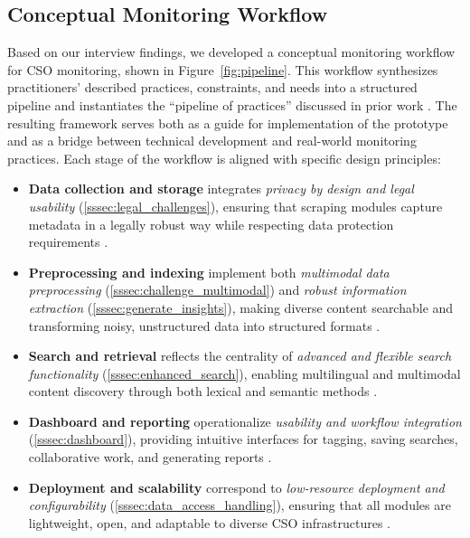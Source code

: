 \documentclass[acmsmall]{acmart}
\begin{document}
\subsection{Conceptual Monitoring Workflow}
Based on our interview findings, we developed a conceptual monitoring workflow for CSO monitoring, shown in Figure~\ref{fig:pipeline}. This workflow synthesizes practitioners' described practices, constraints, and needs into a structured pipeline and instantiates the ``pipeline of practices'' discussed in prior work \cite{micallef_true_2022}. The resulting framework serves both as a guide for implementation of the prototype and as a bridge between technical development and real-world monitoring practices. Each stage of the workflow is aligned with specific design principles: 
\begin{itemize}
    \item \textbf{Data collection and storage} integrates \textit{privacy by design and legal usability} (\ref{sssec:legal_challenges}), ensuring that scraping modules capture metadata in a legally robust way while respecting data protection requirements \cite{baumler_harnessing_2025,hancock_seeing_2024,lakomy_open-source_2024}. 
   \item \textbf{Preprocessing and indexing} implement both \textit{multimodal data preprocessing} (\ref{sssec:challenge_multimodal}) and \textit{robust information extraction} (\ref{sssec:generate_insights}), making diverse content searchable and transforming noisy, unstructured data into structured formats \cite{cifliku_save_2025, juneja_human_2022,liu_human-centered_2024,ayache2024whispernerunifiedopennamed}. 
   \item \textbf{Search and retrieval} reflects the centrality of \textit{advanced and flexible search functionality} (\ref{sssec:enhanced_search}), enabling multilingual and multimodal content discovery through both lexical and semantic methods \cite{mukhopadhyay_osint_2024,beers_examining_2020,juneja_human_2022}. 
   \item \textbf{Dashboard and reporting} operationalize \textit{usability and workflow integration} (\ref{sssec:dashboard}), providing intuitive interfaces for tagging, saving searches, collaborative work, and generating reports \cite{cifliku_save_2025,baumler_harnessing_2025,liu_human-centered_2024}. 
   \item \textbf{Deployment and scalability} correspond to \textit{low-resource deployment and configurability} (\ref{sssec:data_access_handling}), ensuring that all modules are lightweight, open, and adaptable to diverse CSO infrastructures \cite{baumler_harnessing_2025,hummel_civil_2022,hulshof-schmidt_2024_2024,hancock_seeing_2024}.
\end{itemize}
\end{document}
